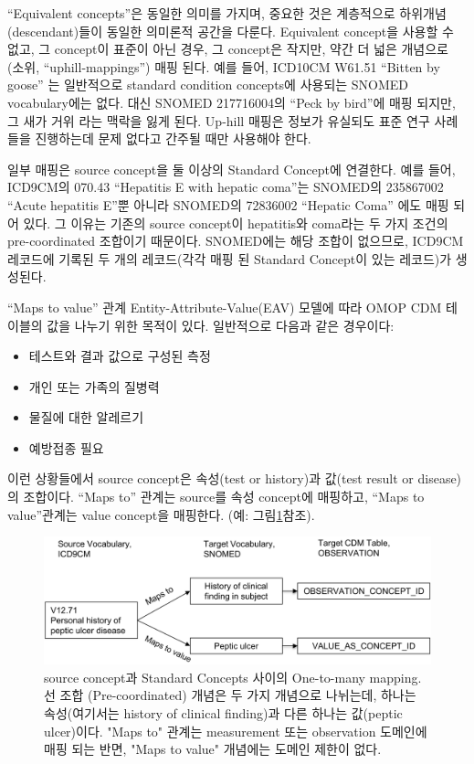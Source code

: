 \documentclass[11pt]{book}
\providecommand{\tightlist}{%
  \setlength{\itemsep}{0pt}\setlength{\parskip}{0pt}}
\theoremstyle{definition}
\theoremstyle{definition}
\theoremstyle{definition}
\theoremstyle{remark}
\begin{document}
``Equivalent concepts''은 동일한 의미를 가지며, 중요한 것은 계층적으로
하위개념 (descendant)들이 동일한 의미론적 공간을 다룬다. Equivalent
concept을 사용할 수 없고, 그 concept이 표준이 아닌 경우, 그 concept은
작지만, 약간 더 넓은 개념으로 (소위, ``uphill-mappings'') 매핑 된다.
예를 들어, ICD10CM W61.51 ``Bitten by goose'' 는 일반적으로 standard
condition concepts에 사용되는 SNOMED vocabulary에는 없다. 대신 SNOMED
217716004의 ``Peck by bird''에 매핑 되지만, 그 새가 거위 라는 맥락을
잃게 된다. Up-hill 매핑은 정보가 유실되도 표준 연구 사례들을 진행하는데
문제 없다고 간주될 때만 사용해야 한다.

일부 매핑은 source concept을 둘 이상의 Standard Concept에 연결한다. 예를
들어, ICD9CM의 070.43 ``Hepatitis E with hepatic coma''는 SNOMED의
235867002 ``Acute hepatitis E''뿐 아니라 SNOMED의 72836002 ``Hepatic
Coma'' 에도 매핑 되어 있다. 그 이유는 기존의 source concept이
hepatitis와 coma라는 두 가지 조건의 pre-coordinated 조합이기 때문이다.
SNOMED에는 해당 조합이 없으므로, ICD9CM 레코드에 기록된 두 개의
레코드(각각 매핑 된 Standard Concept이 있는 레코드)가 생성된다.

``Maps to value'' 관계 Entity-Attribute-Value(EAV) 모델에 따라 OMOP CDM
테이블의 값을 나누기 위한 목적이 있다. 일반적으로 다음과 같은 경우이다:

\begin{itemize}
\tightlist
\item
  테스트와 결과 값으로 구성된 측정
\item
  개인 또는 가족의 질병력
\item
  물질에 대한 알레르기
\item
  예방접종 필요
\end{itemize}

이런 상황들에서 source concept은 속성(test or history)과 값(test result
or disease)의 조합이다. ``Maps to'' 관계는 source를 속성 concept에
매핑하고, ``Maps to value''관계는 value concept을 매핑한다. (예:
그림\ref{fig:conceptValue}참조).

\begin{figure}

{\centering \includegraphics[width=1\linewidth]{images/StandardizedVocabularies/conceptValue} 

}

\caption{source concept과 Standard Concepts 사이의 One-to-many mapping. 선 조합 (Pre-coordinated) 개념은 두 가지 개념으로 나뉘는데, 하나는 속성(여기서는 history of clinical finding)과 다른 하나는 값(peptic ulcer)이다. "Maps to" 관계는 measurement 또는 observation 도메인에 매핑 되는 반면, "Maps to value" 개념에는 도메인 제한이 없다.}\label{fig:conceptValue}
\end{figure}
\end{document}
